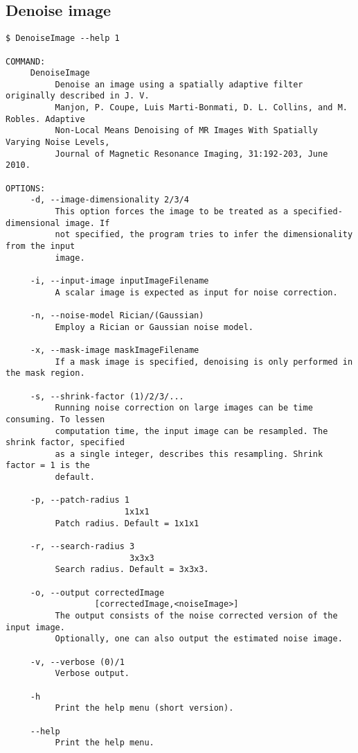 \documentclass{InsightArticle}
\begin{document}
\subsection{Denoise image}

\small
\begin{verbatim}
$ DenoiseImage --help 1

COMMAND:
     DenoiseImage
          Denoise an image using a spatially adaptive filter originally described in J. V.
          Manjon, P. Coupe, Luis Marti-Bonmati, D. L. Collins, and M. Robles. Adaptive
          Non-Local Means Denoising of MR Images With Spatially Varying Noise Levels,
          Journal of Magnetic Resonance Imaging, 31:192-203, June 2010.

OPTIONS:
     -d, --image-dimensionality 2/3/4
          This option forces the image to be treated as a specified-dimensional image. If
          not specified, the program tries to infer the dimensionality from the input
          image.

     -i, --input-image inputImageFilename
          A scalar image is expected as input for noise correction.

     -n, --noise-model Rician/(Gaussian)
          Employ a Rician or Gaussian noise model.

     -x, --mask-image maskImageFilename
          If a mask image is specified, denoising is only performed in the mask region.

     -s, --shrink-factor (1)/2/3/...
          Running noise correction on large images can be time consuming. To lessen
          computation time, the input image can be resampled. The shrink factor, specified
          as a single integer, describes this resampling. Shrink factor = 1 is the
          default.

     -p, --patch-radius 1
                        1x1x1
          Patch radius. Default = 1x1x1

     -r, --search-radius 3
                         3x3x3
          Search radius. Default = 3x3x3.

     -o, --output correctedImage
                  [correctedImage,<noiseImage>]
          The output consists of the noise corrected version of the input image.
          Optionally, one can also output the estimated noise image.

     -v, --verbose (0)/1
          Verbose output.

     -h
          Print the help menu (short version).

     --help
          Print the help menu.
\end{verbatim}
\normalsize
\end{document}
